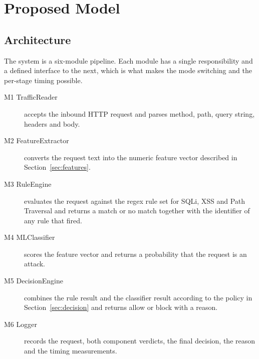 \documentclass[runningheads]{llncs}
\begin{document}
\section{Proposed Model}
\label{sec:model}


\subsection{Architecture}

The system is a six-module pipeline. Each module has a single
responsibility and a defined interface to the next, which is what makes
the mode switching and the per-stage timing possible.

\begin{description}
  \item[M1 TrafficReader] accepts the inbound HTTP request and parses
    method, path, query string, headers and body.
  \item[M2 FeatureExtractor] converts the request text into the numeric
    feature vector described in Section~\ref{sec:features}.
  \item[M3 RuleEngine] evaluates the request against the regex rule set
    for SQLi, XSS and Path Traversal and returns a match or no match
    together with the identifier of any rule that fired.
  \item[M4 MLClassifier] scores the feature vector and returns a
    probability that the request is an attack.
  \item[M5 DecisionEngine] combines the rule result and the classifier
    result according to the policy in Section~\ref{sec:decision} and
    returns allow or block with a reason.
  \item[M6 Logger] records the request, both component verdicts, the
    final decision, the reason and the timing measurements.
\end{description}
\end{document}
